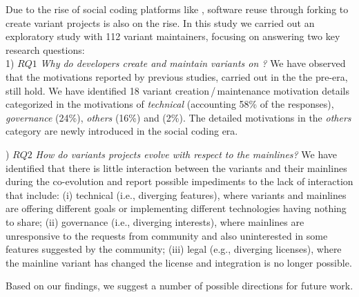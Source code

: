 Due to the rise of social coding platforms like \gh, software reuse through forking to create variant projects is also on the rise.
In this study we carried out an exploratory study with 112 variant maintainers, focusing on answering two key research questions:\\
1) $RQ1$ \textit{Why do developers create and maintain variants on \gh?}
We have observed that the motivations reported by previous studies, carried out in the the pre-\gh era, still hold. We have identified 18 variant creation\,/\,maintenance motivation details categorized in the motivations of \emph{technical} (accounting 58\% of the responses), \emph{governance} (24\%), \emph{others} (16\%) and  (2\%). The detailed motivations in the \emph{others} category are newly introduced in the social coding era.

) $RQ2$ \textit{How do variants projects evolve with respect to the mainlines?}
We have identified that there is little interaction between the variants and their mainlines during the co-evolution and report possible impediments to the lack of interaction that include: (i) technical (i.e., diverging features), where variants and mainlines are offering different goals or implementing different technologies having nothing to share; (ii) governance (i.e., diverging interests), where mainlines are unresponsive to the requests from community and also uninterested in some features suggested by the community; (iii) legal (e.g., diverging licenses), where the mainline variant has changed the license and integration is no longer possible.

Based on our findings, we suggest a number of possible directions for future work.

